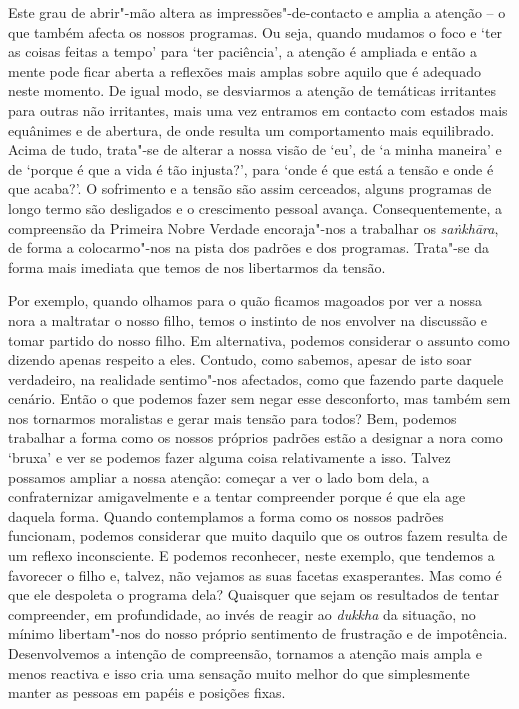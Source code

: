 Este grau de abrir"-mão altera as impressões"-de-contacto e amplia a atenção -- o que também afecta os nossos programas. Ou seja, quando mudamos o foco e `ter as coisas feitas a tempo' para `ter paciência', a atenção é ampliada e então a mente pode ficar aberta a reflexões mais amplas sobre aquilo que é adequado neste momento. De igual modo, se desviarmos a atenção de temáticas irritantes para outras não irritantes, mais uma vez entramos em contacto com estados mais equânimes e de abertura, de onde resulta um comportamento mais equilibrado. Acima de tudo, trata"-se de alterar a nossa visão de `eu', de `a minha maneira' e de `porque é que a vida é tão injusta?', para `onde é que está a tensão e onde é que acaba?'. O sofrimento e a tensão são assim cerceados, alguns programas de longo termo são desligados e o crescimento pessoal avança. Consequentemente, a compreensão da Primeira Nobre Verdade encoraja"-nos a trabalhar os \emph{saṅkhāra}, de forma a colocarmo"-nos na pista dos padrões e dos programas. Trata"-se da forma mais imediata que temos de nos libertarmos da tensão.

Por exemplo, quando olhamos para o quão ficamos magoados por ver a nossa nora a maltratar o nosso filho, temos o instinto de nos envolver na discussão e tomar partido do nosso filho. Em alternativa, podemos considerar o assunto como dizendo apenas respeito a eles. Contudo, como sabemos, apesar de isto soar verdadeiro, na realidade sentimo"-nos afectados, como que fazendo parte daquele cenário. Então o que podemos fazer sem negar esse desconforto, mas também sem nos tornarmos moralistas e gerar mais tensão para todos? Bem, podemos trabalhar a forma como os nossos próprios padrões estão a designar a nora como `bruxa' e ver se podemos fazer alguma coisa relativamente a isso. Talvez possamos ampliar a nossa atenção: começar a ver o lado bom dela, a confraternizar amigavelmente e a tentar compreender porque é que ela age daquela forma. Quando contemplamos a forma como os nossos padrões funcionam, podemos considerar que muito daquilo que os outros fazem resulta de um reflexo inconsciente. E podemos reconhecer, neste exemplo, que tendemos a favorecer o filho e, talvez, não vejamos as suas facetas exasperantes. Mas como é que ele despoleta o programa dela? Quaisquer que sejam os resultados de tentar compreender, em profundidade, ao invés de reagir ao \emph{dukkha} da situação, no mínimo libertam"-nos do nosso próprio sentimento de frustração e de impotência. Desenvolvemos a intenção de compreensão, tornamos a atenção mais ampla e menos reactiva e isso cria uma sensação muito melhor do que simplesmente manter as pessoas em papéis e posições fixas.

